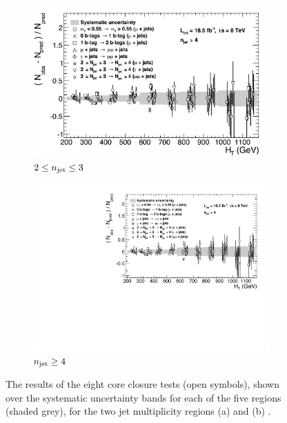 \begin{figure}[ht!]
  \centering
  \begin{subfigure}[b]{0.7\textwidth}
    \includegraphics[width=\textwidth]{Figs/syst/v0/le3j/summary_plot_img}
    \caption{$2 \leq n_{\text{jet}} \leq 3$}
    \label{fig:closure_summary_le3j}
  \end{subfigure}             
  \begin{subfigure}[b]{0.7\textwidth}
    \includegraphics[width=\textwidth]{Figs/syst/v0/ge4j/summary_plot_img}
    \caption{$n_{\text{jet}} \geq 4$}
    \label{fig:closure_summary_ge4j}
  \end{subfigure}
  \caption{The results of the eight core closure tests (open symbols), shown 
  over the systematic uncertainty bands for each of the five \HT regions
  (shaded grey), for the two jet multiplicity regions (a) \njlow and (b) \njhigh.}
  \label{fig:closure_summary}
\end{figure}

